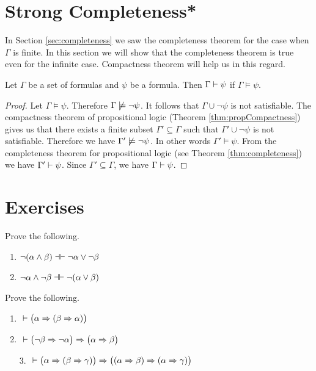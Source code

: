 \section{Strong Completeness*}
In Section \ref{sec:completeness} we saw the completeness theorem for the case when $\Gamma$ is finite. In this section we will show that the completeness theorem is true even for the infinite case. Compactness theorem will help us in this regard.

\begin{theorem}
Let $\Gamma$ be a set of formulas and $\psi$ be a formula. Then $\Gamma \vdash \psi$ if $\Gamma \models \psi$.
\end{theorem}
\begin{proof}
Let $\Gamma \models \psi$. Therefore $\Gamma \not \models \neg \psi$. It follows that $\Gamma \cup \neg \psi$ is not satisfiable. The compactness theorem of propositional logic (Theorem \ref{thm:propCompactness}) gives us that there exists a finite subset $\Gamma' \subseteq \Gamma$ such that $\Gamma' \cup \neg \psi$ is not satisfiable. Therefore we have $\Gamma' \not \models \neg \psi$. In other words $\Gamma' \models \psi$. From the completeness theorem for propositional logic (see Theorem \ref{thm:completeness}) we have $\Gamma' \vdash \psi$. Since $\Gamma' \subseteq \Gamma$, we have $\Gamma \vdash \psi$.
\end{proof}

\section{Exercises}
\begin{exercise}
Prove the following.
\begin{multicols}{2}
\begin{enumerate}
\item $\neg (\alpha \wedge \beta) \dashv \vdash \neg \alpha \vee \neg \beta$
\item $ \neg \alpha \wedge \neg \beta \dashv \vdash  \neg (\alpha \vee \beta)$
\end{enumerate}
\end{multicols}
\label{exercise:demorgan}
\end{exercise}

\begin{exercise}
Prove the following.
\begin{multicols}{2}
\begin{enumerate}
\item \true $~ \vdash \big(\alpha \Rightarrow (\beta \Rightarrow \alpha)\big)$
\item \true $~ \vdash \big(\neg \beta \Rightarrow \neg \alpha \big) \Rightarrow \big(\alpha \Rightarrow \beta \big)$
\end{enumerate}
\end{multicols}
\begin{enumerate} 
\item [3.] \true $~ \vdash \big(\alpha \Rightarrow (\beta \Rightarrow \gamma)\big) \Rightarrow \big((\alpha \Rightarrow \beta) \Rightarrow (\alpha \Rightarrow \gamma)\big)$
\end{enumerate}
\end{exercise}

